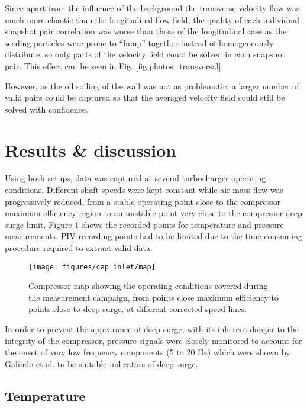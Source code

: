 Since apart from the influence of the background the transverse velocity flow was much more chaotic than the longitudinal flow field, the quality of each individual snapshot pair correlation was worse than those of the longitudinal case as the seeding particles were prone to ``lump'' together instead of homogeneously distribute, so only parts of the velocity field could be solved in each snapshot pair. This effect can be seen in Fig. \ref{fig:photos_transversal}.

However, as the oil soiling of the wall was not as problematic, a larger number of valid pairs could be captured so that the averaged velocity field could still be solved with confidence.

\section{Results \& discussion}

Using both setups, data was captured at several turbocharger operating conditions. Different shaft speeds were kept constant while air mass flow was progressively reduced, from a stable operating point close to the compressor maximum efficiency region to an unstable point very close to the compressor deep surge limit. Figure \ref{fig:map_straight} shows the recorded points for temperature and pressure measurements. PIV recording points had to be limited due to the time-consuming procedure required to extract valid data.

\begin{figure}[htb!]
\centering
\texttt{[image: figures/cap\_inlet/map]}
\caption{Compressor map showing the operating conditions covered during the measurement campaign, from points close maximum efficiency to points close to deep surge, at different corrected speed lines.}
\label{fig:map_straight}
\end{figure}

In order to prevent the appearance of deep surge, with its inherent danger to the integrity of the compressor, pressure signals were closely monitored to account for the onset of very low frequency components (5 to 20 Hz) which were shown by Galindo et al. \cite{galindo2013engine} to be suitable indicators of deep surge.

\subsection{Temperature}
\label{sub:temperature}

